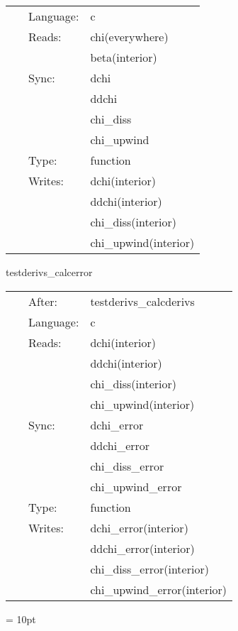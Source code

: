  \begin{tabular*}{160mm}{cll} 
~ & Language:  & c \\ 
~ & Reads:  & chi(everywhere) \\ 
~& ~ &beta(interior)\\ 
~ & Sync:  & dchi \\ 
~& ~ &ddchi\\ 
~& ~ &chi\_diss\\ 
~& ~ &chi\_upwind\\ 
~ & Type:  & function \\ 
~ & Writes:  & dchi(interior) \\ 
~& ~ &ddchi(interior)\\ 
~& ~ &chi\_diss(interior)\\ 
~& ~ &chi\_upwind(interior)\\ 
\end{tabular*} 


\vspace{5mm}


\hspace{5mm} testderivs\_calcerror 

\hspace{5mm}{\it calculate derivs error } 


\hspace{5mm}

 \begin{tabular*}{160mm}{cll} 
~ & After:  & testderivs\_calcderivs \\ 
~ & Language:  & c \\ 
~ & Reads:  & dchi(interior) \\ 
~& ~ &ddchi(interior)\\ 
~& ~ &chi\_diss(interior)\\ 
~& ~ &chi\_upwind(interior)\\ 
~ & Sync:  & dchi\_error \\ 
~& ~ &ddchi\_error\\ 
~& ~ &chi\_diss\_error\\ 
~& ~ &chi\_upwind\_error\\ 
~ & Type:  & function \\ 
~ & Writes:  & dchi\_error(interior) \\ 
~& ~ &ddchi\_error(interior)\\ 
~& ~ &chi\_diss\_error(interior)\\ 
~& ~ &chi\_upwind\_error(interior)\\ 
\end{tabular*} 



\vspace{5mm}\parskip = 10pt 
